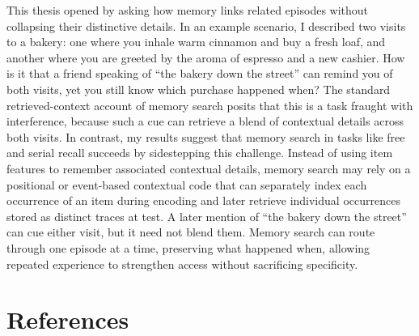 \documentclass[
  letterpaper,
  11pt,
  english,
  singlespacing,
  headsepline]{MastersDoctoralThesis}
\begin{document}
This thesis opened by asking how memory links related episodes without
collapsing their distinctive details. In an example scenario, I
described two visits to a bakery: one where you inhale warm cinnamon and
buy a fresh loaf, and another where you are greeted by the aroma of
espresso and a new cashier. How is it that a friend speaking of ``the
bakery down the street'' can remind you of both visits, yet you still
know which purchase happened when? The standard retrieved-context
account of memory search posits that this is a task fraught with
interference, because such a cue can retrieve a blend of contextual
details across both visits. In contrast, my results suggest that memory
search in tasks like free and serial recall succeeds by sidestepping
this challenge. Instead of using item features to remember associated
contextual details, memory search may rely on a positional or
event-based contextual code that can separately index each occurrence of
an item during encoding and later retrieve individual occurrences stored
as distinct traces at test. A later mention of ``the bakery down the
street'' can cue either visit, but it need not blend them. Memory search
can route through one episode at a time, preserving what happened when,
allowing repeated experience to strengthen access without sacrificing
specificity.


\chapter*{References}\label{references}

\end{document}
